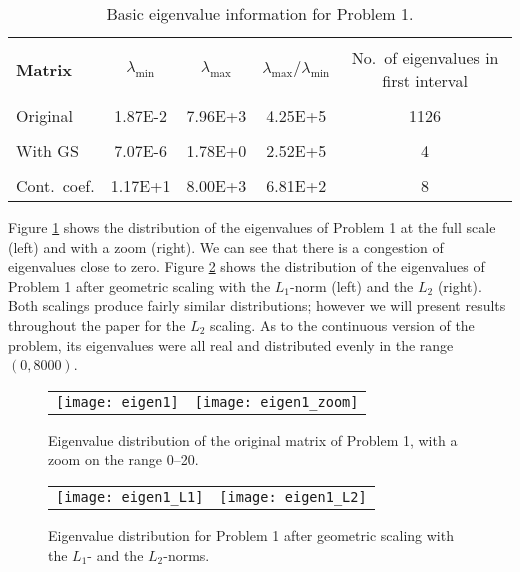 \documentclass[12pt,a4paper]{article}
\newcounter{i}
\begin{document}
\begin{table}[!h]
\centering
\begin{tabular}{|l|c|c|c|c|}
\hline&&&&\\[-12pt]
{\bf Matrix} & $\lambda_{\min}$ & $\lambda_{\max}$ &
$\lambda_{\max} / \lambda_{\min}$ &
\parbox[c]{1.25in}{No.\ of eigenvalues in first interval\vspace{2pt}} \\
\hline&&&&\\[-12pt]
Original & 1.87E-2 & 7.96E+3 & 4.25E+5 & 1126 \\
\hline&&&&\\[-12pt]
With GS & 7.07E-6 & 1.78E+0 & 2.52E+5 & 4 \\
\hline&&&&\\[-12pt]
Cont.\ coef. & 1.17E+1 & 8.00E+3 & 6.81E+2 & 8 \\
\hline
\end{tabular}
\caption{Basic eigenvalue information for Problem 1.}
\label{tbl1b}
\end{table}

Figure \ref{eigen1} shows the distribution of the eigenvalues of 
Problem 1 at the full scale (left) and with a zoom (right).  We 
can see that there is a congestion of eigenvalues close to zero.
Figure \ref{eigen1a} shows the distribution of the eigenvalues of
Problem 1 after geometric scaling with the $L_1$-norm (left) and the
$L_2$ (right).  Both scalings produce fairly similar distributions;
however we will present results throughout the paper for the $L_2$
scaling.  As to the continuous version of the problem, its eigenvalues
were all real and distributed evenly in the range $(0,8000)$.

\begin{figure}[!h]
\begin{tabular}{@{}c@{}c@{}}
\hspace{.1in}
\texttt{[image: eigen1]}
&
\texttt{[image: eigen1\_zoom]}
\end{tabular}
\caption{Eigenvalue distribution of the original matrix of Problem 1,
with a zoom on the range 0--20.}
\label{eigen1}
\end{figure}

\begin{figure}[!h]
\begin{tabular}{@{}c@{}c@{}}
\hspace{.1in}
\texttt{[image: eigen1\_L1]}
&
\texttt{[image: eigen1\_L2]}
\end{tabular}
\vspace{-.1in}
\caption{Eigenvalue distribution for Problem 1 after geometric scaling
with the $L_1$- and the $L_2$-norms.}
\label{eigen1a}
\end{figure}
\end{document}
